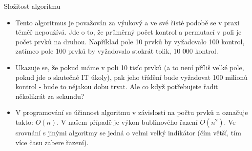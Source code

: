 \documentclass[11pt]{beamer}
\begin{document}
\begin{frame}{Složitost algoritmu}
    \begin{itemize}
        \item Tento algoritmus je považován za výukový a ve své čisté podobě se v praxi téměř nepoužívá. Jde o to, že průměrný počet kontrol a permutací v poli je počet prvků na druhou. Například pole 10 prvků by vyžadovalo 100 kontrol, zatímco pole 100 prvků by vyžadovalo stokrát tolik, 10 000 kontrol.

        \item Ukazuje se, že pokud máme v poli 10 tisíc prvků (a to není příliš velké pole, pokud jde o skutečné IT úkoly), pak jeho třídění bude vyžadovat 100 milionů kontrol - bude to nějakou dobu trvat. Ale co když potřebujete řadit několikrát za sekundu?

        \item V programování se účinnost algoritmu v závislosti na počtu prvků n označuje takto: $O(n)$. V našem případě je výkon bublinového řazení $O(n^2)$. Ve srovnání s jinými algoritmy se jedná o velmi velký indikátor (čím větší, tím více času zabere řazení).
    \end{itemize}
\end{frame}
\end{document}
